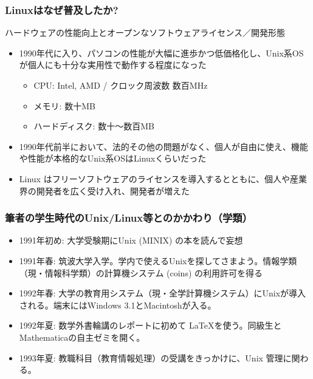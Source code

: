 \documentclass[dvipdfmx]{beamer}
\begin{document}
\begin{frame}
    \frametitle{Linuxはなぜ普及したか?}

    \begin{block}{ハードウェアの性能向上とオープンなソフトウェアライセンス／開発形態}
        \begin{itemize}
            \item 1990年代に入り、パソコンの性能が大幅に進歩かつ低価格化し、Unix系OSが個人にも十分な実用性で動作する程度になった
            \begin{itemize}
                \item CPU: Intel, AMD / クロック周波数 数百MHz
                \item メモリ: 数十MB
                \item ハードディスク: 数十〜数百MB
            \end{itemize}
            \item 1990年代前半において、法的その他の問題がなく、個人が自由に使え、機能や性能が本格的なUnix系OSはLinuxくらいだった
            \item Linux はフリーソフトウェアのライセンスを導入するとともに、個人や産業界の開発者を広く受け入れ、開発者が増えた
        \end{itemize}
    \end{block}
\end{frame}

\begin{frame}%
    \frametitle{筆者の学生時代のUnix/Linux等とのかかわり（学類）}
    \begin{itemize}
        \item<1-> 1991年初め: 大学受験期にUnix (MINIX) の本を読んで妄想
        \item<2-> 1991年春: 筑波大学入学。学内で使えるUnixを探してさまよう。情報学類（現・情報科学類）の計算機システム (coins) の利用許可を得る
        \item<3-> 1992年春: 大学の教育用システム（現・全学計算機システム）にUnixが導入される。端末にはWindows 3.1とMacintoshが入る。
        \item<4-> 1992年夏: 数学外書輪講のレポートに初めて \LaTeX を使う。同級生とMathematicaの自主ゼミを開く。
        \item<5-> 1993年夏: 教職科目（教育情報処理）の受講をきっかけに、Unix 管理に関わる。
    \end{itemize}
\end{frame}
\end{document}
